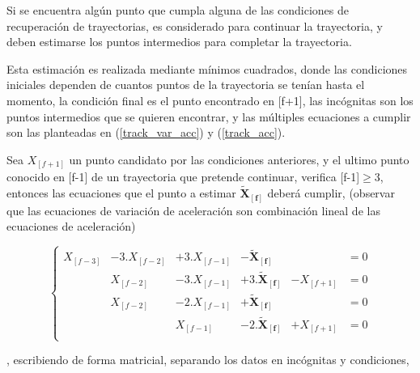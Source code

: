 Si se encuentra algún punto que cumpla alguna de las condiciones de recuperación de trayectorias, es considerado para continuar la trayectoria, y deben estimarse los puntos intermedios para completar la trayectoria.

Esta estimación es realizada mediante mínimos cuadrados, donde las condiciones iniciales dependen de cuantos puntos de la trayectoria se tenían hasta el momento, la condición final es el punto encontrado en [f+1], las incógnitas son los puntos intermedios que se quieren encontrar, y las múltiples ecuaciones a cumplir son las planteadas en (\ref{track_var_acc}) y (\ref{track_acc}).

Sea $X_{[f+1]}$ un punto candidato por las condiciones anteriores, y el ultimo punto conocido en [f-1] de un trayectoria que pretende continuar, verifica [f-1]$\geq$3, entonces las ecuaciones que el punto a estimar $\boldsymbol{\tilde{X}_{[f]}}$ deberá cumplir, (observar que las ecuaciones de variación de aceleración son combinación lineal de las ecuaciones de aceleración)

\begin{equation}
\left\{
\begin{matrix}
X_{[f-3]} &-3.X_{[f-2]} &+3.X_{[f-1]} &-\boldsymbol{\tilde{X}_{[f]}} & &=0 \\
 &X_{[f-2]} &-3.X_{[f-1]} &+3.\boldsymbol{\boldsymbol{\tilde{X}_{[f]}}} &-X_{[f+1]} &=0 \\
 &X_{[f-2]} &-2.X_{[f-1]} &+\boldsymbol{\boldsymbol{\tilde{X}_{[f]}}} & &=0 \\
 & &X_{[f-1]} &-2.\boldsymbol{\boldsymbol{\tilde{X}_{[f]}}} &+X_{[f+1]} &=0 \\
\end{matrix}
\right.
\label{ecuaciones_estimacion_01}
\end{equation}

, escribiendo de forma matricial, separando los datos en incógnitas y condiciones,

